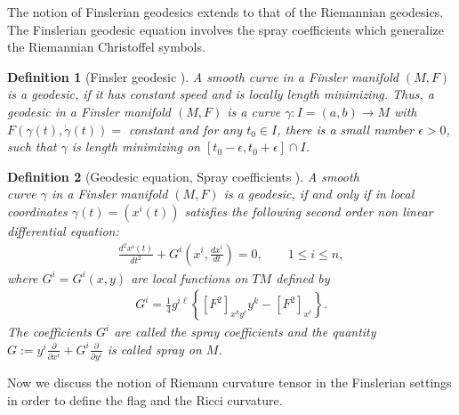\documentclass[pdflatex,sn-mathphys-num]{sn-jnl}%
\theoremstyle{thmstyleone}%
\theoremstyle{thmstyletwo}%
\theoremstyle{thmstylethree}%
\newtheorem{definition}{Definition}%
\begin{document}
\vspace{0.15in}

The notion of Finslerian geodesics extends to that of the
Riemannian geodesics.  The Finslerian geodesic equation
involves the spray coefficients which generalize the Riemannian Christoffel symbols. 

\vspace{0.15in}

\begin{definition}[{Finsler geodesic \cite[\boldmath p. $78$]{SSZ}}]
		\textnormal{A smooth curve  in a Finsler manifold $(M,F)$ is a {\it geodesic}, if it has constant speed and is locally length minimizing. Thus, a geodesic in a Finsler manifold $(M,F)$ is a curve
			$\gamma:I=(a,b)\rightarrow M$ with $F(\gamma(t), \dot{\gamma}(t))=$ constant and for any $t_0\in I$, there is a small number $\epsilon > 0$, such that
			$\gamma$ is length minimizing on $[t_0-\epsilon,t_0+\epsilon]\cap I$.}
	\end{definition}
 
\vspace{0.15in}

\begin{definition}[{Geodesic equation, Spray coefficients  \cite[\boldmath p. $78, 79$]{SSZ}}]
 
	A smooth \\curve $\gamma$ in a Finsler manifold $(M,F)$ is a geodesic, if and only if in local coordinates $\gamma(t)=(x^i(t))$ satisfies the following second order non linear differential equation:
	\begin{align}\label{2.2a}
		\frac{d^2x^i(t)}{dt^2}+{G}^i\left(x^i,\frac{d x^i}{dt}\right)=0, \qquad 1 \le i \le n,
	\end{align}
	where $G^i=G^i(x,y)$ are local functions on $TM$ defined by
	\begin{align}\label{eq1.2}
		{G}^i=\frac{1}{4}{g}^{i{\ell}}\left\{\left[{F}^{2}\right]_{x^ky^{\ell}}y^k-	\left[{F}^{2}\right]_{x^{\ell}}\right\}.
	\end{align}
	The coefficients $G^i$ are called the {\it spray coefficients} and the quantity $G:=y^i\frac{\partial}{\partial x^i}+ G^i\frac{\partial}{\partial y^i}$ is called {\it spray} on $M$.
\end{definition}

\vspace{0.15in}	

Now we discuss the notion of Riemann curvature tensor in the Finslerian settings in order to define the flag and the Ricci curvature.
\end{document}
